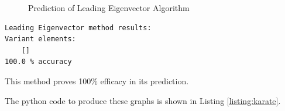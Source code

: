 \begin{figure}[h!]
\centering
{}
\caption{Prediction of Leading Eigenvector Algorithm}
\label{fig:graph_le}
\end{figure}

\begin{verbatim}
Leading Eigenvector method results: 
Variant elements:
	[]
100.0 % accuracy
\end{verbatim}

This method proves 100\% efficacy in its prediction.

\clearpage

The python code to produce these graphs is shown in Listing \ref{listing:karate}.

